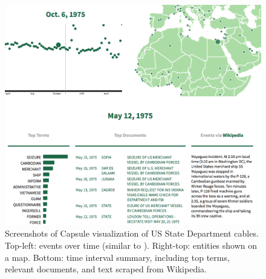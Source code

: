 \begin{figure}
\centering
\includegraphics[width=\linewidth]{fig/viz.png}
\caption{Screenshots of Capsule visualization of US State Department cables.  Top-left: events over time (similar to ).  Right-top: entities shown on a map.  Bottom: time interval summary, including top terms, relevant documents, and text scraped from Wikipedia.}
\label{fig:viz}
\end{figure}

